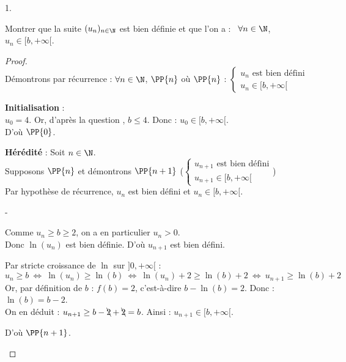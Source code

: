 \documentclass[11pt]{article}%
\begin{document}
\begin{noliste}{1.}
  \setlength{\itemsep}{4mm}
  \setcounter{enumi}{3}
\item Montrer que la suite $(u_n)_{n\in \N}$ est bien définie et que
  l'on a : \ $\forall n \in \N$, $u_n \in [b, +\infty[$.
  
  \begin{proof}~\\
    Démontrons par récurrence : $\forall n\in \N$, $\PP{n}$ \quad où
    \quad $\PP{n}$ : $\left\{
    \begin{array}{l}
      \text{$u_n$ est bien défini}\\
      u_n \in [b,+\infty[
    \end{array}
    \right.$
    \begin{noliste}{\fitem}
      \item {\bf Initialisation} : \\
      $u_0=4$. Or, d'après la question , $b \leq 4$. Donc :
      $u_0 \in [b, +\infty[$.\\
      D'où $\PP{0}$.
      
      \item {\bf Hérédité} : Soit $n\in \N$.\\
      Supposons $\PP{n}$ et démontrons $\PP{n+1}$ (\ie $\left\{
      \begin{array}{l}
        \text{$u_{n+1}$ est bien défini}\\
        u_{n+1} \in [b,+\infty[
      \end{array}
      \right.$)\\[.2cm]
      Par hypothèse de récurrence, $u_n$ est bien défini et $u_n \in 
      [b,+\infty[$.
      \begin{noliste}{-}
	\item Comme $u_n \geq b \geq 2$, on a en particulier $u_n>0$.\\
	Donc $\ln(u_n)$ est bien définie. D'où $u_{n+1}$ est bien 
	défini.
	
	\item Par stricte croissance de $\ln$ sur $]0,+\infty[$ :
	\[
	  u_n \geq b \ \Leftrightarrow \ \ln(u_n) \geq \ln(b) 
	  \ \Leftrightarrow \ \ln(u_n) +2 \geq \ln(b)+2 
	  \ \Leftrightarrow \ u_{n+1} \geq \ln(b)+2
	\]
	Or, par définition de $b$ : $f(b)=2$, c'est-à-dire 
	$b-\ln(b)=2$. Donc : $\ln(b) = b-2$.\\
	On en déduit : $u_{n+1} \geq b - \bcancel{2} + \bcancel{2}
	=b$.
	Ainsi : $u_{n+1} \in [b,+\infty[$.
      \end{noliste}
      D'où $\PP{n+1}$.
    \end{noliste}
    \conc{Par principe de récurrence, on obtient que $(u_n)$ est bien 
    définie et :
    $\forall n\in \N, \ u_n \in [b,+\infty[$.}
    

\end{proof}
\end{noliste}
\end{document}
